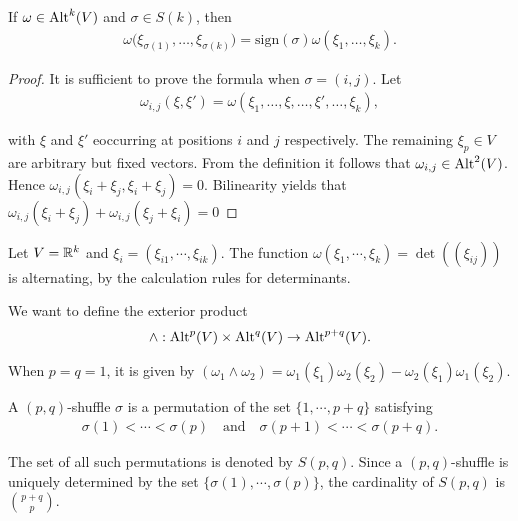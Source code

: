 \begin{lemma}
  If $\omega\in\operatorname{Alt}^k(V)$ and $\sigma\in S(k)$, then
  \begin{align*}
    \omega\big(\xi_{\sigma(1)},\ldots,\xi_{\sigma(k)}\big)=\mathrm{sign}(\sigma)\omega(\xi_{1},\ldots,\xi_{k}).
  \end{align*}
\end{lemma}

\begin{proof}
  It is sufficient to prove the formula when $\sigma = (i, j)$. Let
  \begin{align*}
    \omega_{i,j}(\xi,\xi')=\omega(\xi_{1},\ldots,\xi,\ldots,\xi',\ldots,\xi_{k}),
  \end{align*}

  with $\xi$ and $\xi'$ eoccurring at positions $i$ and $j$ respectively. The remaining $\xi_p\in V$
  are arbitrary but fixed vectors. From the definition it follows that $\omega_{i,j}\in\operatorname{Alt}^2(V)$.
  Hence $\omega_{i,j} (\xi_i + \xi_j, \xi_i + \xi_j) = 0$. Bilinearity yields that
  $\omega_{i,j} (\xi_i + \xi_j) + \omega_{i,j} (\xi_j + \xi_i) = 0$
\end{proof}


\begin{example}
  Let $V = \mathbb{R}^k$ and $\xi_i = (\xi_{i1}, \cdots, \xi_{ik})$. The function $\omega(\xi_1, \cdots, \xi_k) = \det((\xi_{ij}))$
  is alternating, by the calculation rules for determinants.
\end{example}

We want to define the exterior product
\begin{align*}
  \wedge: \operatorname{Alt}^p(V)\times\operatorname{Alt}^q(V) \to \operatorname{Alt}^{p+q}(V).
\end{align*}

When $p=q=1$, it is given by $(\omega_1\wedge\omega_2) = \omega_1(\xi_1)\omega_2(\xi_2) - \omega_2(\xi_1)\omega_1(\xi_2)$.

\begin{definition}
  A $(p, q)$-shuffle $\sigma$ is a permutation of the set $\{1, \cdots, p + q\}$ satisfying
  \begin{align*}
    \sigma(1) < \cdots < \sigma(p) \quad\text{and}\quad \sigma(p + 1) < \cdots < \sigma(p + q).
  \end{align*}

  The set of all such permutations is denoted by $S(p, q)$. Since a $(p, q)$-shuffle is uniquely determined by the
  set $\{\sigma(1),\cdots,\sigma(p)\}$, the cardinality of $S(p, q)$ is $\binom{p + q}{p}$.
\end{definition}


